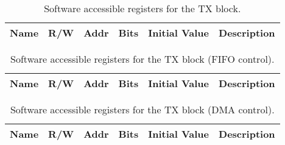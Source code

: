 \begin{table}[H]
  \centering
  \begin{tabular}{|l|c|c|r|P{0.8cm}|p{7.5cm}|}
    \hline
    
    {\bf Name} & {\bf R/W} & {\bf Addr} & {\bf Bits} & {\bf Initial Value} & {\bf Description} \\ \hline

    
    
  \end{tabular}
  \caption{Software accessible registers for the TX block.}
  \label{tab:rgtx}
\end{table}

\begin{table}[H]
  \centering
  \begin{tabular}{|l|c|c|r|P{0.8cm}|p{5.5cm}|}
    \hline
    
    {\bf Name} & {\bf R/W} & {\bf Addr} & {\bf Bits} & {\bf Initial Value} & {\bf Description} \\ \hline

    
    
  \end{tabular}
  \caption{Software accessible registers for the TX block (FIFO control).}
  \label{tab:rgfifotx}
\end{table}

\begin{table}[H]
  \centering
  \begin{tabular}{|l|c|c|r|P{0.8cm}|p{6.5cm}|}
    \hline
    
    {\bf Name} & {\bf R/W} & {\bf Addr} & {\bf Bits} & {\bf Initial Value} & {\bf Description} \\ \hline

    
    
  \end{tabular}
  \caption{Software accessible registers for the TX block (DMA control).}
  \label{tab:rgdmatx}
\end{table}
